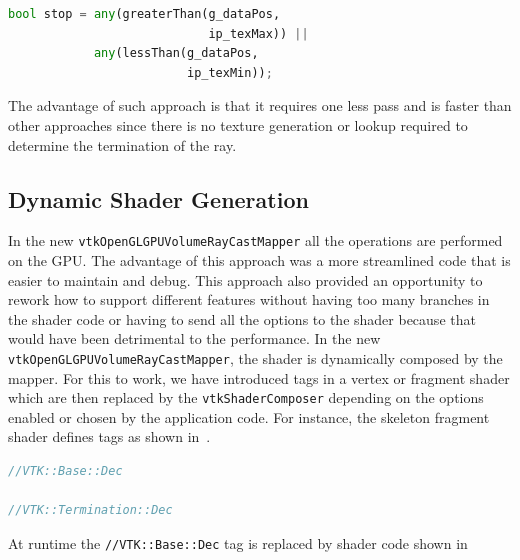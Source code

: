 \begin{center}
  \begin{lstlisting}[language=Python, caption={Ray stop determination},
                     captionpos=b, frame=single, breaklines=true]
bool stop = any(greaterThan(g_dataPos,
                            ip_texMax)) ||
            any(lessThan(g_dataPos,
                         ip_texMin));
  \end{lstlisting}
\end{center}

The advantage of such approach is that it requires one less pass and is faster
than other approaches since there is no texture generation or lookup required
to determine the termination of the ray.


\subsection{Dynamic Shader Generation}
In the new \texttt{vtkOpenGLGPUVolumeRayCastMapper} all the operations are
performed on the GPU. The advantage of this approach was a more streamlined code
that is easier to maintain and debug. This approach also provided an opportunity
to rework how to support different features without having too many branches in
the shader code or having to send all the options to the shader because that
would have been detrimental to the performance. In the new
\texttt{vtkOpenGLGPUVolumeRayCastMapper}, the shader is dynamically composed by
the mapper. For this to work, we have introduced tags in a vertex or fragment
shader which are then replaced by the \texttt{vtkShaderComposer} depending on
the options enabled or chosen by the application code. For instance, the
skeleton fragment shader defines tags as shown in~.

\begin{lstlisting}[language=C++, caption={Fragment shader tags},
                   captionpos=b, frame=single, breaklines=true,
                   label=lst:skeletonshader]
//VTK::Base::Dec

//VTK::Termination::Dec

\end{lstlisting}

At runtime the \texttt{//VTK::Base::Dec} tag is replaced by shader code
shown in~

